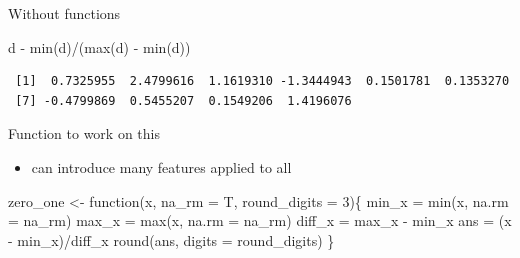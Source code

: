 \documentclass[
  ignorenonframetext,
]{beamer}
\newenvironment{Shaded}{\begin{snugshade}}{\end{snugshade}}
\newcommand{\AttributeTok}[1]{\textcolor[rgb]{0.40,0.45,0.13}{#1}}
\newcommand{\ControlFlowTok}[1]{\textcolor[rgb]{0.00,0.23,0.31}{#1}}
\newcommand{\DecValTok}[1]{\textcolor[rgb]{0.68,0.00,0.00}{#1}}
\newcommand{\FunctionTok}[1]{\textcolor[rgb]{0.28,0.35,0.67}{#1}}
\newcommand{\NormalTok}[1]{\textcolor[rgb]{0.00,0.23,0.31}{#1}}
\newcommand{\OtherTok}[1]{\textcolor[rgb]{0.00,0.23,0.31}{#1}}
\newcommand{\SpecialCharTok}[1]{\textcolor[rgb]{0.37,0.37,0.37}{#1}}
\providecommand{\tightlist}{%
  \setlength{\itemsep}{0pt}\setlength{\parskip}{0pt}}\usepackage{longtable,booktabs,array}
\begin{document}
\begin{frame}[fragile]
\begin{block}{Without functions}
\begin{Shaded}
\begin{Highlighting}[]
\NormalTok{d }\SpecialCharTok{{-}} \FunctionTok{min}\NormalTok{(d)}\SpecialCharTok{/}\NormalTok{(}\FunctionTok{max}\NormalTok{(d) }\SpecialCharTok{{-}} \FunctionTok{min}\NormalTok{(d))}
\end{Highlighting}
\end{Shaded}

\begin{verbatim}
 [1]  0.7325955  2.4799616  1.1619310 -1.3444943  0.1501781  0.1353270
 [7] -0.4799869  0.5455207  0.1549206  1.4196076
\end{verbatim}
\end{block}
\end{frame}

\begin{frame}[fragile]
\begin{block}{Function to work on this}
\protect\hypertarget{function-to-work-on-this}{}
\begin{itemize}
\tightlist
\item
  can introduce many features applied to all
\end{itemize}

\begin{Shaded}
\begin{Highlighting}[]
\NormalTok{zero\_one }\OtherTok{\textless{}{-}} \ControlFlowTok{function}\NormalTok{(x, }\AttributeTok{na\_rm =}\NormalTok{ T, }\AttributeTok{round\_digits =} \DecValTok{3}\NormalTok{)\{}
\NormalTok{  min\_x }\OtherTok{=} \FunctionTok{min}\NormalTok{(x, }\AttributeTok{na.rm =}\NormalTok{ na\_rm)}
\NormalTok{  max\_x }\OtherTok{=} \FunctionTok{max}\NormalTok{(x, }\AttributeTok{na.rm =}\NormalTok{ na\_rm)}
\NormalTok{  diff\_x }\OtherTok{=}\NormalTok{ max\_x }\SpecialCharTok{{-}}\NormalTok{ min\_x}
\NormalTok{  ans }\OtherTok{=}\NormalTok{ (x }\SpecialCharTok{{-}}\NormalTok{ min\_x)}\SpecialCharTok{/}\NormalTok{diff\_x}
  \FunctionTok{round}\NormalTok{(ans, }\AttributeTok{digits =}\NormalTok{ round\_digits)}
\NormalTok{\}}
\end{Highlighting}
\end{Shaded}
\end{block}
\end{frame}
\end{document}
